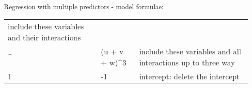 \documentclass[
  ignorenonframetext,
]{beamer}
\begin{document}
\begin{frame}{Regression with multiple predictors - model formulae:}
\begin{longtable}[]{@{}lll@{}}
\begin{minipage}[t]{0.53\columnwidth}
include these variables and their interactions\strut
\end{minipage}\tabularnewline
\begin{minipage}[t]{0.14\columnwidth}\raggedright
\^{}\strut
\end{minipage} & \begin{minipage}[t]{0.24\columnwidth}\raggedright
(u + v + w)\^{}3\strut
\end{minipage} & \begin{minipage}[t]{0.53\columnwidth}\raggedright
include these variables and all interactions up to three way\strut
\end{minipage}\tabularnewline
\begin{minipage}[t]{0.14\columnwidth}\raggedright
1\strut
\end{minipage} & \begin{minipage}[t]{0.24\columnwidth}\raggedright
-1\strut
\end{minipage} & \begin{minipage}[t]{0.53\columnwidth}\raggedright
intercept: delete the intercept\strut
\end{minipage}\tabularnewline
\bottomrule
\end{longtable}

\end{frame}
\end{document}
